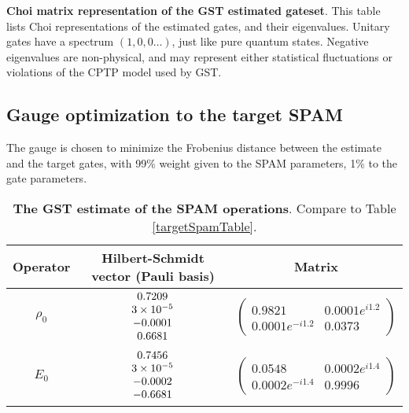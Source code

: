 {\begin{table}[h]
\begin{center}
\caption{\textbf{Choi matrix representation of the GST estimated gateset}.  This table lists Choi representations of the estimated gates, and their eigenvalues.  Unitary gates have a spectrum $(1,0,0\ldots)$, just like pure quantum states.  Negative eigenvalues are non-physical, and may represent either statistical fluctuations or violations of the CPTP model used by GST.\label{bestTargetGatesetChoiTable}}
\end{center}
\end{table}


\clearpage

\subsection{Gauge optimization to the target SPAM}
The gauge is chosen to minimize the Frobenius distance between the estimate and the target gates, with 99\% weight given to the SPAM parameters, 1\% to the gate parameters.

\begin{table}[h]
\begin{center}
\begin{tabular}[l]{|c|c|c|}
\hline
Operator & Hilbert-Schmidt vector (Pauli basis) & Matrix \\ \hline
$\rho_{0}$ & $ \begin{array}{c}
0.7209 \\ 
3\times 10^{-5} \\ 
-0.0001 \\ 
0.6681
 \end{array} $
 & $ \left(\!\!\begin{array}{cc}
0.9821 & 0.0001e^{i1.2} \\ 
0.0001e^{-i1.2} & 0.0373
 \end{array}\!\!\right) $
 \\ \hline
$E_{0}$ & $ \begin{array}{c}
0.7456 \\ 
3\times 10^{-5} \\ 
-0.0002 \\ 
-0.6681
 \end{array} $
 & $ \left(\!\!\begin{array}{cc}
0.0548 & 0.0002e^{i1.4} \\ 
0.0002e^{-i1.4} & 0.9996
 \end{array}\!\!\right) $
 \\ \hline
\end{tabular}

\caption{\textbf{The GST estimate of the SPAM operations}.  Compare to Table \ref{targetSpamTable}.\label{bestTargetSpamGatesetSpamTable}}
\end{center}
\end{table}

}
